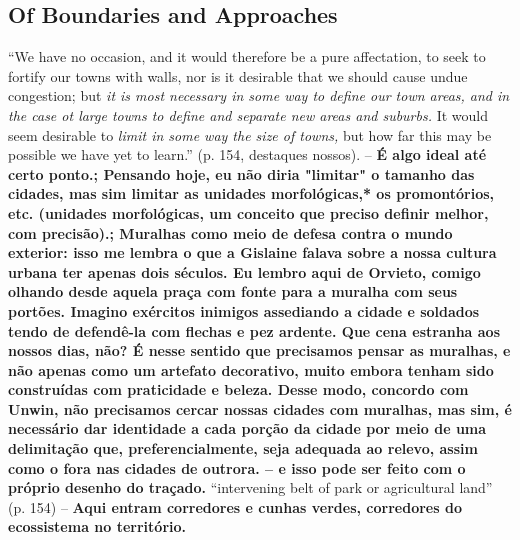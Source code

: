 \documentclass[12pt, a4paper]{book} %
\begin{document}
        \subsection*{Of Boundaries and Approaches}

        ``We have no occasion, and it would therefore be a pure affectation, to seek to fortify our towns with walls, nor is it desirable that we should cause undue congestion; but \textit{it is most necessary in some way to define our town areas, and in the case ot large towns to define and separate new areas and suburbs.} It would seem desirable to \textit{limit in some way the size of towns,} but how far this may be possible we have yet to learn.'' (p. 154, destaques nossos). – \textbf{É algo ideal até certo ponto.; Pensando hoje, eu não diria "limitar" o tamanho das cidades, mas sim limitar as unidades morfológicas,* os promontórios, etc.  (unidades morfológicas, um conceito que preciso definir melhor, com precisão).; Muralhas como meio de defesa contra o mundo exterior: isso me lembra o que a Gislaine falava sobre a nossa cultura urbana ter apenas dois séculos. Eu lembro aqui de Orvieto, comigo olhando desde aquela praça com fonte para a muralha com seus portões. Imagino exércitos inimigos assediando a cidade e soldados tendo de defendê-la com flechas e pez ardente. Que cena estranha aos nossos dias, não? É nesse sentido que precisamos pensar as muralhas, e não apenas como um artefato decorativo, muito embora tenham sido construídas com praticidade e beleza. Desse modo, concordo com Unwin, não precisamos cercar nossas cidades com muralhas, mas sim, é necessário dar identidade a cada porção da cidade por meio de uma delimitação que, preferencialmente, seja adequada ao relevo, assim como o fora nas cidades de outrora. – e isso pode ser feito com o próprio desenho do traçado.}
        ``intervening belt of park or agricultural land'' (p. 154) – \textbf{Aqui entram corredores e cunhas verdes, corredores do ecossistema no território.}
\end{document}
